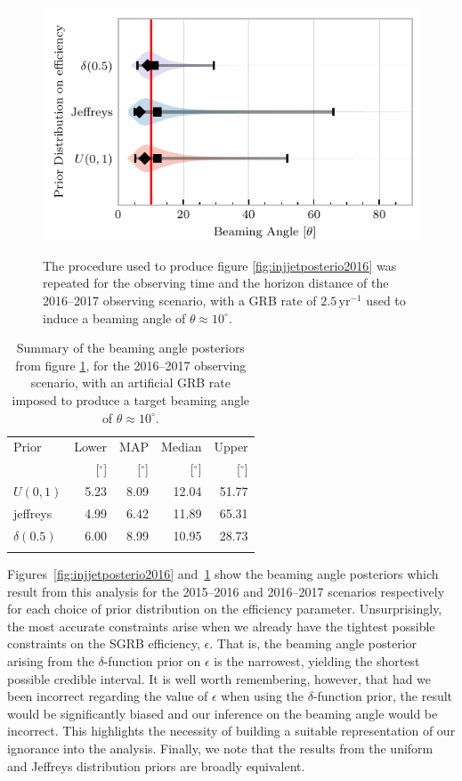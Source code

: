 \documentclass[twocolumn,nofootinbib]{revtex4-1}
\newcommand{\yr}{\mathrm{yr}}
\begin{document}
\begin{figure}%
\centering
{\includegraphics[width=\linewidth]{O2_injections_violin.pdf}}
\caption{The procedure used to produce figure \ref{fig:injjetposterio2016} was repeated for the observing time and the horizon distance of the 2016--2017 observing scenario, with a GRB rate of $2.5 \,\yr^{-1}$ used to induce a beaming angle of $\theta \approx 10^{\circ}$.
  \label{fig:injjetposterio2022}}
\end{figure}
\begin{table}
  \centering
  \begin{tabular}{lrrrr}
    \toprule
    Prior & Lower & MAP & Median & Upper\\
          & [$^\circ$] & [$^\circ$]& [$^\circ$]& [$^\circ$] \\
    \colrule
$U(0,1)$ & 5.23	 & 8.09	 & 12.04	 & 51.77	 \\
jeffreys & 4.99	 & 6.42	 & 11.89	 & 65.31	 \\
$\delta(0.5)$ & 6.00	 & 8.99	 & 10.95	 & 28.73	 \\
\botrule
\end{tabular}
\caption{Summary of the beaming angle posteriors from figure
  \ref{fig:injjetposterio2022}, for the 2016--2017 observing scenario,
  with an artificial GRB rate imposed to produce a target beaming
  angle of $\theta \approx 10^{\circ}$.}
  \label{tab:summaryinj2016}
\end{table}

%
Figures~\ref{fig:injjetposterio2016} and~\ref{fig:injjetposterio2022}
show the beaming angle posteriors which result from this analysis for
the 2015--2016 and 2016--2017 scenarios respectively for each choice
of prior distribution on the efficiency parameter.  Unsurprisingly,
the most accurate constraints arise when we already have the tightest
possible constraints on the \ac{SGRB} efficiency, $\epsilon$.  That
is, the beaming angle posterior arising from the $\delta$-function
prior on $\epsilon$ is the narrowest, yielding the shortest possible
credible interval.  It is well worth remembering, however, that had
we been incorrect regarding the value of $\epsilon$ when using the
$\delta$-function prior, the result would be significantly biased and
our inference on the beaming angle would be incorrect.  This
highlights the necessity of building a suitable representation of our
ignorance into the analysis.  Finally, we note that the results from
the uniform and Jeffreys distribution priors are broadly equivalent.
\end{document}
